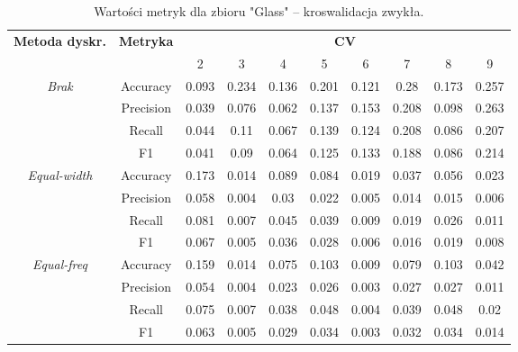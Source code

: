 \begin{table}[H]
\center
\caption{Wartości metryk dla zbioru "Glass" -- kroswalidacja zwykła.}
    \begin{tabular}{|c|c|c|c|c|c|c|c|c|c|}
        \hline
        \multirow{2}{*}{\textbf{Metoda dyskr.}} & \multirow{2}{*}{\textbf{Metryka}} & \multicolumn{8}{|c|}{\textbf{CV}} \\ \cline{3-10}
                        &  & 2 & 3 & 4 & 5 & 6 & 7 & 8 & 9 \\ \hline
        \multirow{4}{*}{\textit{Brak}}  & Accuracy & 0.093 & 0.234 & 0.136 & 0.201 & 0.121 & 0.28 & 0.173 & 0.257 \\ \cline{2-10}
                                         & Precision & 0.039 & 0.076 & 0.062 & 0.137 & 0.153 & 0.208 & 0.098 & 0.263 \\ \cline{2-10}
                                         & Recall & 0.044 & 0.11 & 0.067 & 0.139 & 0.124 & 0.208 & 0.086 & 0.207 \\ \cline{2-10}
                                         & F1 & 0.041 & 0.09 & 0.064 & 0.125 & 0.133 & 0.188 & 0.086 & 0.214 \\ \hline \hline


        \multirow{4}{*}{\textit{Equal-width}}  & Accuracy & 0.173 & 0.014 & 0.089 & 0.084 & 0.019 & 0.037 & 0.056 & 0.023 \\ \cline{2-10}
                                                 & Precision & 0.058 & 0.004 & 0.03 & 0.022 & 0.005 & 0.014 & 0.015 & 0.006 \\ \cline{2-10}
                                                 & Recall & 0.081 & 0.007 & 0.045 & 0.039 & 0.009 & 0.019 & 0.026 & 0.011 \\ \cline{2-10}
                                                 & F1 & 0.067 & 0.005 & 0.036 & 0.028 & 0.006 & 0.016 & 0.019 & 0.008 \\ \hline \hline


        \multirow{4}{*}{\textit{Equal-freq}}  & Accuracy & 0.159 & 0.014 & 0.075 & 0.103 & 0.009 & 0.079 & 0.103 & 0.042 \\ \cline{2-10}
                                             & Precision & 0.054 & 0.004 & 0.023 & 0.026 & 0.003 & 0.027 & 0.027 & 0.011 \\ \cline{2-10}
                                             & Recall & 0.075 & 0.007 & 0.038 & 0.048 & 0.004 & 0.039 & 0.048 & 0.02 \\ \cline{2-10}
                                             & F1 & 0.063 & 0.005 & 0.029 & 0.034 & 0.003 & 0.032 & 0.034 & 0.014 \\ \hline \hline



\end{tabular}
\end{table}

